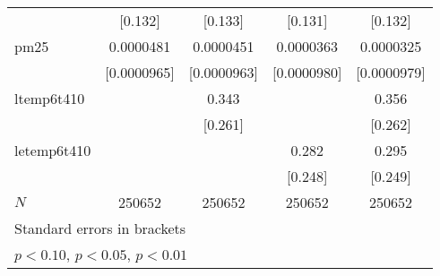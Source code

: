 \documentclass[11pt]{article}
\begin{document}
\begin{subappendices}
\begin{center}
{{\begin{tabular}{l*{4}{c}}
					&     [0.132]         &     [0.133]         &     [0.131]         &     [0.132]         \\
					[1em]
					pm25        &   0.0000481         &   0.0000451         &   0.0000363         &   0.0000325         \\
					& [0.0000965]         & [0.0000963]         & [0.0000980]         & [0.0000979]         \\
					[1em]
					ltemp6t410  &                     &       0.343         &                     &       0.356         \\
					&                     &     [0.261]         &                     &     [0.262]         \\
					[1em]
					letemp6t410 &                     &                     &       0.282         &       0.295         \\
					&                     &                     &     [0.248]         &     [0.249]         \\
					\hline
					\(N\)       &      250652         &      250652         &      250652         &      250652         \\
					\hline\hline
					\multicolumn{5}{l}{\footnotesize Standard errors in brackets}\\
					\multicolumn{5}{l}{\footnotesize \sym{*} \(p<0.10\), \sym{**} \(p<0.05\), \sym{***} \(p<0.01\)}\\
				\end{tabular}
			}
			
			}
		\end{center}
		

\end{subappendices}
\end{document}
